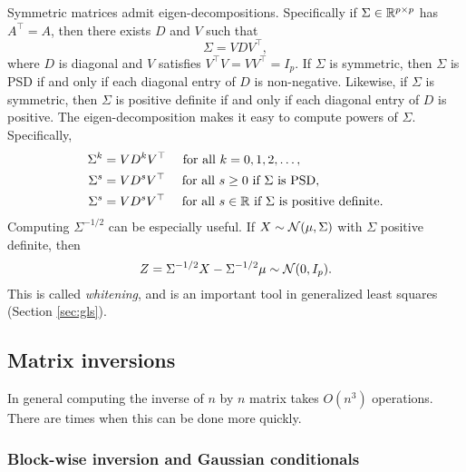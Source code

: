 Symmetric matrices admit eigen-decompositions. Specifically if $\Sigma \in \mathbb{R}^{p \times p}$ has $A^\top = A$, then there exists $D$ and $V$ such that
\[\Sigma = VDV^\top,\]
where $D$ is diagonal and $V$ satisfies $V^\top V = VV^\top = I_p$. If $\Sigma$ is symmetric, then $\Sigma$ is PSD if and only if each diagonal entry of $D$ is non-negative. Likewise, if $\Sigma$ is symmetric, then $\Sigma$ is positive definite if and only if each diagonal entry of $D$ is positive. The eigen-decomposition makes it easy to compute powers of $\Sigma$. Specifically,
\begin{align*}
    \Sigma^k&= VD^kV^\top \quad \text{ for all } k =0,1,2,\ldots,\\
    \Sigma^s&= VD^sV^\top \quad \text{ for all } s \ge 0 \text{ if $\Sigma$ is PSD},\\
    \Sigma^s&= VD^sV^\top \quad \text{ for all } s \in \mathbb{R} \text{ if $\Sigma$ is positive definite}.
\end{align*}
Computing $\Sigma^{-1/2}$ can be especially useful. If $X \sim {\mathcal N}(\mu,\Sigma)$ with $\Sigma$ positive definite, then
\[Z = \Sigma^{-1/2}X - \Sigma^{-1/2}\mu \sim {\mathcal N}(0,I_p). \]
This is called \emph{whitening}, and is an important tool in generalized least squares (Section \ref{sec:gls}).

\subsection{Matrix inversions}

In general computing the inverse of $n$ by $n$ matrix takes $O(n^3)$ operations. There are times when this can be done more quickly. 

\subsubsection*{Block-wise inversion and Gaussian conditionals}

